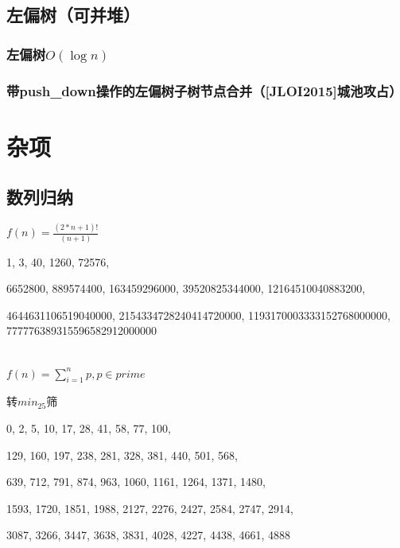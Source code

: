 \documentclass[landscape,twoside,a4paper]{article}
\begin{document}
\subsection{左偏树（可并堆）}

\subsubsection{左偏树$O(\log n)$}


\subsubsection{带push\_down操作的左偏树子树节点合并（[JLOI2015]城池攻占）}



\section{杂项}

\subsection{数列归纳}

$f(n) = \frac{(2*n + 1)!}{(n + 1)}$\par
1, 3, 40, 1260, 72576, \par
6652800, 889574400, 163459296000, 39520825344000, 12164510040883200, \par
4644631106519040000, 2154334728240414720000, 1193170003333152768000000, 777776389315596582912000000\par

~\\

$f(n) = \sum_{i=1}^{n} p, p \in prime$\par
转$min_25筛$\par
0, 2, 5, 10, 17, 28, 41, 58, 77, 100, \par
129, 160, 197, 238, 281, 328, 381, 440, 501, 568, \par
639, 712, 791, 874, 963, 1060, 1161, 1264, 1371, 1480, \par
1593, 1720, 1851, 1988, 2127, 2276, 2427, 2584, 2747, 2914, \par
3087, 3266, 3447, 3638, 3831, 4028, 4227, 4438, 4661, 4888\par
\par
\end{document}
